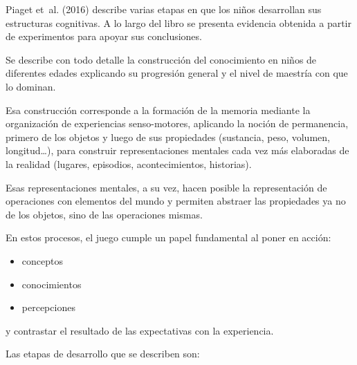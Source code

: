 \documentclass[
  12,
]{scrartcl}
\providecommand{\tightlist}{%
  \setlength{\itemsep}{0pt}\setlength{\parskip}{0pt}}
\begin{document}
Piaget et~al. (2016) describe varias etapas en que los niños desarrollan
sus estructuras cognitivas. A lo largo del libro se presenta evidencia
obtenida a partir de experimentos para apoyar sus conclusiones.

Se describe con todo detalle la construcción del conocimiento en niños
de diferentes edades explicando su progresión general y el nivel de
maestría con que lo dominan.

Esa construcción corresponde a la formación de la memoria mediante la
organización de experiencias senso-motores, aplicando la noción de
permanencia, primero de los objetos y luego de sus propiedades
(sustancia, peso, volumen, longitud\ldots), para construir
representaciones mentales cada vez más elaboradas de la realidad
(lugares, episodios, acontecimientos, historias).

Esas representaciones mentales, a su vez, hacen posible la
representación de operaciones con elementos del mundo y permiten
abstraer las propiedades ya no de los objetos, sino de las operaciones
mismas.

En estos procesos, el juego cumple un papel fundamental al poner en
acción:

\begin{itemize}
\tightlist
\item
  conceptos
\item
  conocimientos
\item
  percepciones
\end{itemize}

y contrastar el resultado de las expectativas con la experiencia.

Las etapas de desarrollo que se describen son:
\end{document}

